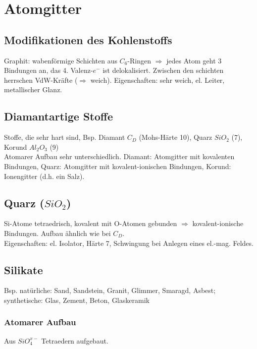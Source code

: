 \section{Atomgitter}

\subsection{Modifikationen des Kohlenstoffs}
Graphit: wabenförmige Schichten aus $C_6$-Ringen $\Rightarrow$ jedes Atom geht 3 Bindungen an, das 4. Valenz-$e^-$ ist delokalisiert. Zwischen den schichten herrschen VdW-Kräfte ($\Rightarrow$ weich). Eigenschaften: sehr weich, el. Leiter, metallischer Glanz.

\subsection{Diamantartige Stoffe}
Stoffe, die sehr hart sind, Bsp. Diamant $C_D$ (Mohs-Härte 10), Quarz $SiO_2$ (7), Korund $Al_2O_3$ (9) \\

Atomarer Aufbau sehr unterschiedlich. Diamant: Atomgitter mit kovalenten Bindungen, Quarz: Atomgitter mit kovalent-ionischen Bindungen, Korund: Ionengitter (d.h. ein Salz).

\newpage

\subsection{Quarz ($SiO_2$)}
Si-Atome tetraedrisch, kovalent mit O-Atomen gebunden $\Rightarrow$ kovalent-ionische Bindungen. Aufbau ähnlich wie bei $C_D$. \\

Eigenschaften: el. Isolator, Härte 7, Schwingung bei Anlegen eines el.-mag. Feldes. \\

\subsection{Silikate}
Bsp. natürliche: Sand, Sandstein, Granit, Glimmer, Smaragd, Asbest; synthetische: Glas, Zement, Beton, Glaskeramik \\

\subsubsection{Atomarer Aufbau}
Aus $SiO_4^{x-}$ Tetraedern aufgebaut. \\

